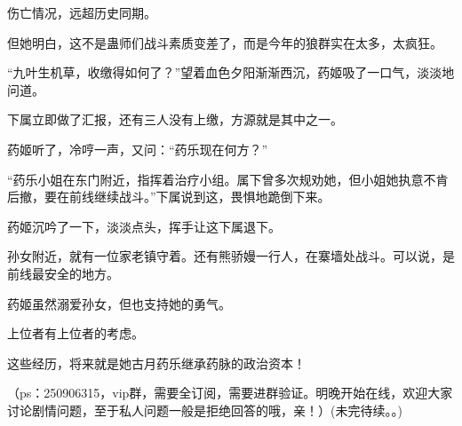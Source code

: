 \begin{this_body}
伤亡情况，远超历史同期。

但她明白，这不是蛊师们战斗素质变差了，而是今年的狼群实在太多，太疯狂。

“九叶生机草，收缴得如何了？”望着血色夕阳渐渐西沉，药姬吸了一口气，淡淡地问道。

下属立即做了汇报，还有三人没有上缴，方源就是其中之一。

药姬听了，冷哼一声，又问：“药乐现在何方？”

“药乐小姐在东门附近，指挥着治疗小组。属下曾多次规劝她，但小姐她执意不肯后撤，要在前线继续战斗。”下属说到这，畏惧地跪倒下来。

药姬沉吟了一下，淡淡点头，挥手让这下属退下。

孙女附近，就有一位家老镇守着。还有熊骄嫚一行人，在寨墙处战斗。可以说，是前线最安全的地方。

药姬虽然溺爱孙女，但也支持她的勇气。

上位者有上位者的考虑。

这些经历，将来就是她古月药乐继承药脉的政治资本！

（ps：250906315，vip群，需要全订阅，需要进群验证。明晚开始在线，欢迎大家讨论剧情问题，至于私人问题一般是拒绝回答的哦，亲！）(未完待续。。)

\end{this_body}

